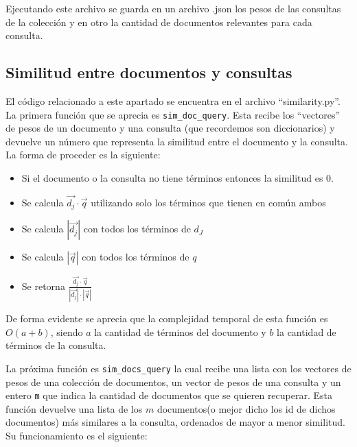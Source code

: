 \documentclass[runningheads]{llncs}
\begin{document}
	Ejecutando este archivo se guarda en un archivo .json los pesos de las consultas de la colecci\'on y en otro la cantidad de documentos relevantes para cada consulta.
	
	\subsection{Similitud entre documentos y consultas}
	
	El c\'odigo relacionado  a este apartado se encuentra en el archivo ``similarity.py''. La primera funci\'on que se aprecia es \verb|sim_doc_query|. Esta recibe los ``vectores'' de pesos de un documento y una consulta (que recordemos son diccionarios) y devuelve un n\'umero que representa la similitud entre el documento y la consulta. La forma de proceder es la siguiente:
	
	\begin{itemize}
		\item Si el documento o la consulta no tiene t\'erminos entonces la similitud es 0.
		
		\item Se calcula $\overrightarrow{d_j}\cdot\overrightarrow{q}$ utilizando solo los t\'erminos que tienen en com\'un ambos
		
		\item Se calcula $|\overrightarrow{d_j}|$ con todos los t\'erminos de $d_J$
		
		\item Se calcula $|\overrightarrow{q}|$ con todos los t\'erminos de $q$
		
		\item Se retorna $\frac{\overrightarrow{d_j}\cdot\overrightarrow{q}}{|\overrightarrow{d_j}|\cdot|\overrightarrow{q}|}$
	\end{itemize}
	
	De forma evidente se aprecia que la complejidad temporal de esta funci\'on es $O(a + b)$, siendo $a$ la cantidad de t\'erminos del documento y $b$ la cantidad de t\'erminos de la consulta.
		
	La pr\'oxima funci\'on es \verb|sim_docs_query| la cual recibe una lista con los vectores de pesos de una colecci\'on de documentos, un vector de pesos de una consulta y un entero \verb|m| que indica la cantidad de documentos que se quieren recuperar. Esta funci\'on devuelve una lista de los $m$ documentos(o mejor dicho los id de dichos documentos) m\'as similares a la consulta, ordenados de mayor a menor similitud. Su funcionamiento es el siguiente:
	
\end{document}
